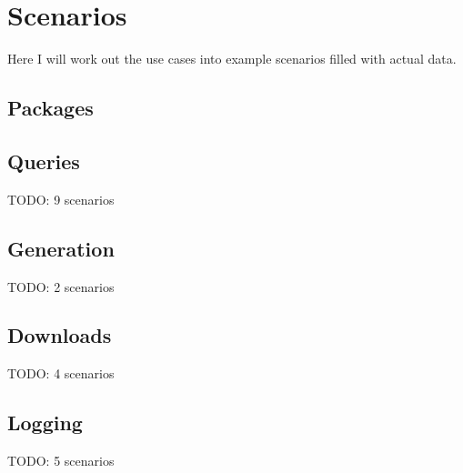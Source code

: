 \newpage
\section{Scenarios}  
Here I will work out the use cases into example scenarios filled with actual
data.


\subsection{Packages}









\subsection{Queries}
TODO: 9 scenarios



%
%
%
%
%
%
%
%
%


\subsection{Generation}
TODO: 2 scenarios
%
%


\subsection{Downloads}
TODO: 4 scenarios
%
%
%
%


\subsection{Logging}
TODO: 5 scenarios
%
%
%
%
%


